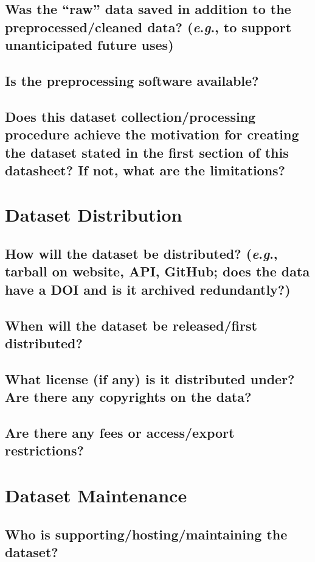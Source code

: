 \documentclass[a4paper,9pt]{extarticle}
\newcommand{\eg}{\textit{e}.\textit{g}., }
\begin{document}
\begin{multicols}{2}
\subsection*{Was the “raw” data saved in addition to the preprocessed/cleaned data? (\eg to support unanticipated future uses)}
\noindent
\subsection*{Is the preprocessing software available?}
\noindent
\subsection*{Does this dataset collection/processing procedure achieve the motivation for creating the dataset stated in the first section of this datasheet? If not, what are the limitations?}
\noindent

\section*{Dataset Distribution}
\subsection*{How will the dataset be distributed? (\eg tarball on website, API, GitHub; does the data have a DOI and is it archived redundantly?)}
\noindent
\subsection*{When will the dataset be released/first distributed?}
\noindent
\subsection*{What license (if any) is it distributed under? Are there any copyrights on the data?}
\noindent
\subsection*{Are there any fees or access/export restrictions?}
\noindent


\section*{Dataset Maintenance}
\subsection*{Who is supporting/hosting/maintaining the dataset?}
\noindent

\end{multicols}
\end{document}
